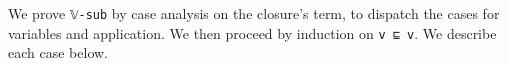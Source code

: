We prove \texttt{𝕍-sub} by case analysis on the closure's term, to
dispatch the cases for variables and application. We then proceed by
induction on \texttt{v\textquotesingle{}\ ⊑\ v}. We describe each case
below.

\begin{fence}
\begin{code}%
\>[0]\AgdaSpace{}%
\AgdaSymbol{\{}\AgdaSpace{}%
\AgdaSymbol{(}\AgdaSpace{}%
\AgdaSymbol{)}\AgdaSpace{}%
\AgdaSymbol{\}}\AgdaSpace{}%
\AgdaSymbol{\{}\AgdaSymbol{\}}\AgdaSpace{}%
\AgdaSymbol{()}\AgdaSpace{}%
\<%
\\
\>[0]\AgdaSpace{}%
\AgdaSymbol{\{}\AgdaSpace{}%
\AgdaSymbol{(}\AgdaSpace{}%
\AgdaSpace{}%
\AgdaSymbol{)}\AgdaSpace{}%
\AgdaSymbol{\}}\AgdaSpace{}%
\AgdaSymbol{()}\AgdaSpace{}%
\<%
\\
\>[0]\AgdaSpace{}%
\AgdaSymbol{\{}\AgdaSpace{}%
\AgdaSymbol{(}\AgdaSpace{}%
\AgdaSymbol{)}\AgdaSpace{}%
\AgdaSymbol{\}}\AgdaSpace{}%
\AgdaSpace{}%
\AgdaSpace{}%
\AgdaSymbol{=}\AgdaSpace{}%
\<%
\\
\>[0]\AgdaSpace{}%
\AgdaSymbol{\{}\AgdaSpace{}%
\AgdaSymbol{(}\AgdaSpace{}%
\AgdaSymbol{)}\AgdaSpace{}%
\AgdaSymbol{\}}\AgdaSpace{}%
\AgdaSpace{}%
\AgdaSymbol{(}\AgdaSpace{}%
\AgdaSpace{}%
\AgdaSymbol{)}\AgdaSpace{}%
\AgdaSymbol{=}\AgdaSpace{}%
\AgdaSpace{}%
\AgdaSymbol{(}\AgdaSpace{}%
\AgdaSpace{}%
\AgdaSymbol{)}\AgdaSpace{}%
\AgdaOperator{\AgdaInductiveConstructor{,}}\AgdaSpace{}%
\AgdaSpace{}%
\AgdaSpace{}%
\AgdaSpace{}%
\<%
\\
\>[0]\AgdaSpace{}%
\AgdaSymbol{\{}\AgdaSpace{}%
\AgdaSymbol{(}\AgdaSpace{}%
\AgdaSymbol{)}\AgdaSpace{}%

\end{code}
\end{fence}
